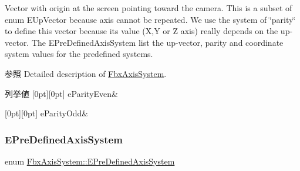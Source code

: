 Vector with origin at the screen pointing toward the camera. This is a subset of enum E\+Up\+Vector because axis cannot be repeated. We use the system of \char`\"{}parity\char`\"{} to define this vector because its value (X,Y or Z axis) really depends on the up-\/vector. The E\+Pre\+Defined\+Axis\+System list the up-\/vector, parity and coordinate system values for the predefined systems. \begin{DoxySeeAlso}{参照}
Detailed description of \hyperlink{class_fbx_axis_system}{Fbx\+Axis\+System}. 
\end{DoxySeeAlso}
\begin{DoxyEnumFields}{列挙値}
[0pt][0pt]{}\mbox{\label{class_fbx_axis_system_a34bce1daad7ed6ae71916bb825d3ec87a60d99824537be50ebc6aa4169438da55}} 
e\+Parity\+Even&\\
\hline

[0pt][0pt]{}\mbox{\label{class_fbx_axis_system_a34bce1daad7ed6ae71916bb825d3ec87a918bd8db749bc1ed4f2f176c27e67023}} 
e\+Parity\+Odd&\\
\hline

\end{DoxyEnumFields}
\mbox{\label{class_fbx_axis_system_a0391b88959ec9ed790cb76eac9a6ed17}} 
\subsubsection{\texorpdfstring{E\+Pre\+Defined\+Axis\+System}{EPreDefinedAxisSystem}}
{\footnotesize\ttfamily enum \hyperlink{class_fbx_axis_system_a0391b88959ec9ed790cb76eac9a6ed17}{Fbx\+Axis\+System\+::\+E\+Pre\+Defined\+Axis\+System}}

